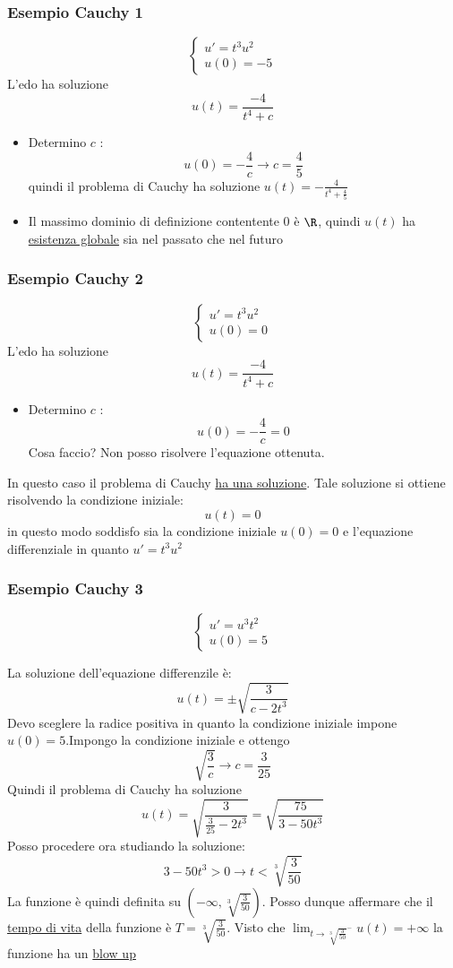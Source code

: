 \subsubsection*{Esempio Cauchy 1}
\[
	\begin{cases}
		u' = t^3 u^2 \\
		u\left( 0 \right) = -5
	\end{cases}
\]
L'edo ha soluzione
\[
	u\left( t \right) = \frac{-4}{t ^{4}+ c}
\]
\begin{itemize}
	\item Determino $ c $ :
	      \[
		      u\left( 0 \right) = -\frac{4}{c} \rightarrow c = \frac{4}{5}
	      \]
	      quindi il problema di Cauchy ha soluzione $ u\left( t \right)= -\frac{4}{t ^{4}+ \frac{4}{5}} $
	\item Il massimo dominio di definizione contentente $ 0 $ è $ \R $, quindi $ u\left( t \right)  $ ha \underline{esistenza globale} sia nel passato che nel futuro
\end{itemize}
\subsubsection*{Esempio Cauchy 2}
\[
	\begin{cases}
		u' = t^3 u^2 \\
		u\left( 0 \right) = 0
	\end{cases}
\]
L'edo ha soluzione
\[
	u\left( t \right) = \frac{-4}{t ^{4}+ c}
\]
\begin{itemize}
	\item Determino $ c $ :
	      \[
		      u\left( 0 \right) = -\frac{4}{c} =0
	      \]
	      Cosa faccio? Non posso risolvere l'equazione ottenuta.
\end{itemize}
In questo caso il problema di Cauchy \underline{ha una soluzione}. Tale soluzione si ottiene risolvendo la condizione iniziale:
\[
	u\left( t \right) =0
\]
in questo modo soddisfo sia la condizione iniziale $ u\left( 0 \right) =0 $ e l'equazione differenziale in quanto $ u' = t^3 u^2 $
\subsubsection*{Esempio Cauchy 3}
\[
	\begin{cases}
		u' = u^3 t^2 \\
		u\left( 0 \right) =5
	\end{cases}
\]

La soluzione dell'equazione differenzile è:
\[
	u\left( t \right) = \pm \sqrt{\frac{3}{c-2t^3}}
\]
Devo sceglere la radice positiva in quanto la condizione iniziale impone $ u\left( 0 \right) =5 $.Impongo la condizione iniziale e ottengo
\[
	\sqrt{\frac{3}{c}} \rightarrow c = \frac{3}{25}
\]
Quindi il problema di Cauchy ha soluzione
\[
	u\left( t \right) = \sqrt{\frac{3}{\frac{3}{25} - 2 t ^3}} = \sqrt{ \frac{75}{3 - 50 t^3}}
\]
Posso procedere ora studiando la soluzione:
\[
	3 - 50 t^3 > 0 \rightarrow t < \sqrt[3]{\frac{3}{50}}
\]
La funzione è quindi definita su $ \left( - \infty, \sqrt[3]{\frac{3}{50}}  \right)  $. Posso dunque affermare che il \underline{tempo di vita} della funzione è $ T= \sqrt[3]{\frac{3}{50}} $. Visto che $ \lim_{t \to \sqrt[3]{\frac{3}{50}}^{-}} u\left( t \right)   = + \infty $ la funzione ha un \underline{blow up}
